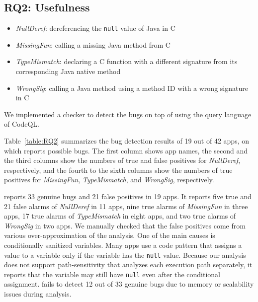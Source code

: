 

\subsection{RQ2: Usefulness}
\begin{itemize}
  \item {\it NullDeref}: dereferencing the {\tt null} value of Java in C
  \item {\it MissingFun}: calling a missing Java method from C
  \item {\it TypeMismatch}: declaring a C function with a different signature
    from its corresponding Java native method
  \item {\it WrongSig}: calling a Java method using a method ID with a
    wrong signature in C
\end{itemize}
We implemented a checker to detect the bugs on top of \ours using the
query language of CodeQL. 

Table~\ref{table:RQ2} summarizes the bug detection results of 19 out of 42
apps, on which \ours reports possible bugs.  The first
column shows app names, the second and the third columns show the
numbers of true and false positives for {\it NullDeref}, respectively, and
the fourth to the sixth columns show the numbers of true positives for {\it
MissingFun}, {\it TypeMismatch}, and {\it WrongSig}, respectively.

\ours reports 33 genuine bugs and 21 false positives in 19 apps.
It reports five true and 21 false alarms of {\it NullDeref} in 11 apps,
nine true alarms of {\it MissingFun} in three apps,
17 true alarms of {\it TypeMismatch} in eight apps, and
two true alarms of {\it WrongSig} in two apps.
We manually checked that the false positives come from various over-approximation
of the analysis. One of the main causes is conditionally sanitized variables.  Many apps
use a code pattern that assigns a value to a variable only if the variable has
the {\tt null} value. Because our analysis does not support
path-sensitivity that analyzes each execution path separately, it reports that
the variable may still have {\tt null} even after the conditional assignment.
 \lees fails to detect 12 out of 33 genuine bugs
due to memory or scalability issues during analysis.

